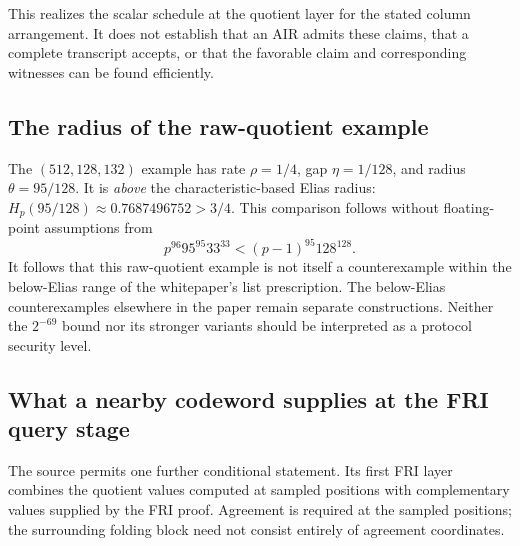 \documentclass[11pt,letterpaper]{article}
\theoremstyle{definition}
\theoremstyle{remark}
\begin{document}
This realizes the scalar schedule at the quotient layer for the stated
column arrangement. It does not establish that an AIR admits these
claims, that a complete transcript accepts, or that the favorable claim
and corresponding witnesses can be found efficiently.

\subsection{The radius of the raw-quotient example}
\label{sec:raw-radius-audit}

The $(512,128,132)$ example has rate $\rho=1/4$, gap $\eta=1/128$,
and radius $\theta=95/128$. It is \emph{above} the characteristic-based
Elias radius: $H_p(95/128)\approx0.7687496752>3/4$.
This comparison follows without floating-point assumptions from
\[
 p^{96}95^{95}33^{33}<(p-1)^{95}128^{128}.
\]
It follows that this raw-quotient example is not itself a counterexample
within the below-Elias range of the whitepaper's list prescription.
The below-Elias counterexamples elsewhere in the paper remain separate
constructions. Neither the $2^{-69}$ bound nor its stronger variants
should be interpreted as a protocol security level.

\subsection{What a nearby codeword supplies at the FRI query stage}
\label{sec:query-survival}

The source permits one further conditional statement. Its first FRI
layer combines the quotient values computed at sampled positions with
complementary values supplied by the FRI proof. Agreement is required
at the sampled positions; the surrounding folding block need not consist
entirely of agreement coordinates.
\end{document}
